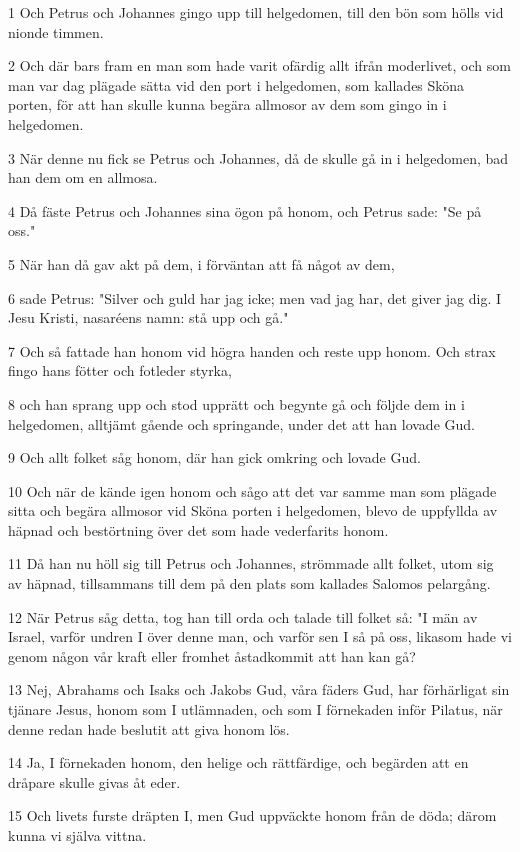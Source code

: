 \par 1 Och Petrus och Johannes gingo upp till helgedomen, till den bön som hölls vid nionde timmen.
\par 2 Och där bars fram en man som hade varit ofärdig allt ifrån moderlivet, och som man var dag plägade sätta vid den port i helgedomen, som kallades Sköna porten, för att han skulle kunna begära allmosor av dem som gingo in i helgedomen.
\par 3 När denne nu fick se Petrus och Johannes, då de skulle gå in i helgedomen, bad han dem om en allmosa.
\par 4 Då fäste Petrus och Johannes sina ögon på honom, och Petrus sade: "Se på oss."
\par 5 När han då gav akt på dem, i förväntan att få något av dem,
\par 6 sade Petrus: "Silver och guld har jag icke; men vad jag har, det giver jag dig. I Jesu Kristi, nasaréens namn: stå upp och gå."
\par 7 Och så fattade han honom vid högra handen och reste upp honom. Och strax fingo hans fötter och fotleder styrka,
\par 8 och han sprang upp och stod upprätt och begynte gå och följde dem in i helgedomen, alltjämt gående och springande, under det att han lovade Gud.
\par 9 Och allt folket såg honom, där han gick omkring och lovade Gud.
\par 10 Och när de kände igen honom och sågo att det var samme man som plägade sitta och begära allmosor vid Sköna porten i helgedomen, blevo de uppfyllda av häpnad och bestörtning över det som hade vederfarits honom.
\par 11 Då han nu höll sig till Petrus och Johannes, strömmade allt folket, utom sig av häpnad, tillsammans till dem på den plats som kallades Salomos pelargång.
\par 12 När Petrus såg detta, tog han till orda och talade till folket så: "I män av Israel, varför undren I över denne man, och varför sen I så på oss, likasom hade vi genom någon vår kraft eller fromhet åstadkommit att han kan gå?
\par 13 Nej, Abrahams och Isaks och Jakobs Gud, våra fäders Gud, har förhärligat sin tjänare Jesus, honom som I utlämnaden, och som I förnekaden inför Pilatus, när denne redan hade beslutit att giva honom lös.
\par 14 Ja, I förnekaden honom, den helige och rättfärdige, och begärden att en dråpare skulle givas åt eder.
\par 15 Och livets furste dräpten I, men Gud uppväckte honom från de döda; därom kunna vi själva vittna.
